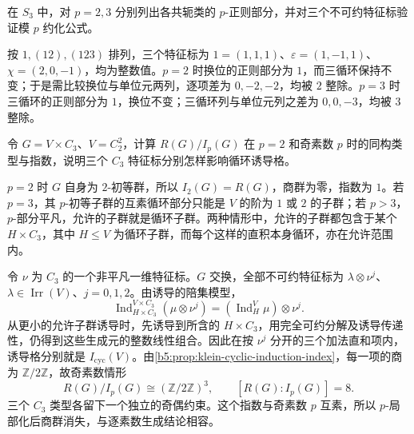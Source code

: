 \begin{exercise}\label{b5:ex:05-p-regular-s3}
	在 \(S_3\) 中，对 \(p=2,3\) 分别列出各共轭类的 \(p\)-正则部分，并对三个不可约特征标验证模 \(p\) 约化公式。
\end{exercise}
\begin{solution}
	按 \(1,(12),(123)\) 排列，三个特征标为 \(1=(1,1,1)\)、\(\varepsilon=(1,-1,1)\)、\(\chi=(2,0,-1)\)，均为整数值。\(p=2\) 时换位的正则部分为 \(1\)，而三循环保持不变；于是需比较换位与单位元两列，逐项差为 \(0,-2,-2\)，均被 \(2\) 整除。\(p=3\) 时三循环的正则部分为 \(1\)，换位不变；三循环列与单位元列之差为 \(0,0,-3\)，均被 \(3\) 整除。
\end{solution}

\begin{exercise}\label{b5:ex:05-local-indices-klein}
	令 \(G=V\times C_3\)、\(V=C_2^2\)，计算 \(R(G)/I_p(G)\) 在 \(p=2\) 和奇素数 \(p\) 时的同构类型与指数，说明三个 \(C_3\) 特征标分别怎样影响循环诱导格。
\end{exercise}
\begin{solution}
	\(p=2\) 时 \(G\) 自身为 \(2\)-初等群，所以 \(I_2(G)=R(G)\)，商群为零，指数为 \(1\)。若 \(p=3\)，其 \(p\)-初等子群的互素循环部分只能是 \(V\) 的阶为 \(1\) 或 \(2\) 的子群；若 \(p>3\)，\(p\)-部分平凡，允许的子群就是循环子群。两种情形中，允许的子群都包含于某个 \(H\times C_3\)，其中 \(H\le V\) 为循环子群，而每个这样的直积本身循环，亦在允许范围内。

	令 \(\nu\) 为 \(C_3\) 的一个非平凡一维特征标。\(G\) 交换，全部不可约特征标为 \(\lambda\otimes\nu^j\)、\(\lambda\in\operatorname{Irr}(V)\)、\(j=0,1,2\)。由诱导的陪集模型，
	\[
		\operatorname{Ind}_{H\times C_3}^{V\times C_3}(\mu\otimes\nu^j) =(\operatorname{Ind}_H^V\mu)\otimes\nu^j.
	\]
	从更小的允许子群诱导时，先诱导到所含的 \(H\times C_3\)，用完全可约分解及诱导传递性，仍得到这些生成元的整数线性组合。因此在按 \(\nu^j\) 分开的三个加法直和项内，诱导格分别就是 \(I_{\mathrm{cyc}}(V)\)。由\cref{b5:prop:klein-cyclic-induction-index}，每一项的商为 \(\mathbb Z/2\mathbb Z\)，故奇素数情形
	\[
		R(G)/I_p(G)\cong(\mathbb Z/2\mathbb Z)^3, \qquad [R(G):I_p(G)]=8.
	\]
	三个 \(C_3\) 类型各留下一个独立的奇偶约束。这个指数与奇素数 \(p\) 互素，所以 \(p\)-局部化后商群消失，与逐素数生成结论相容。
\end{solution}

